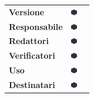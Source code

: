 \begin{table}[H]
\centering
	\hspace{3.5cm}
	\renewcommand{\arraystretch}{1.4}
	\begin{tabular}{p{2.5cm} p{15px} p{8cm}}
		\textbf{Versione} & \includegraphics[width=10px]{../../template/images/dot} & \documentVersion\\
		\textbf{Responsabile} & \includegraphics[width=10px]{../../template/images/dot} & \documentApprovers \\
		\textbf{Redattori} & \includegraphics[width=10px]{../../template/images/dot} & \documentEditors \\
		\textbf{Verificatori} & \includegraphics[width=10px]{../../template/images/dot} & \documentVerifiers \\
		\textbf{Uso} & \includegraphics[width=10px]{../../template/images/dot} & \documentUsage \\

		
		\textbf{Destinatari} & \includegraphics[width=10px]{../../template/images/dot} & \documentAddressee \\
		
	\end{tabular}
\end{table}



